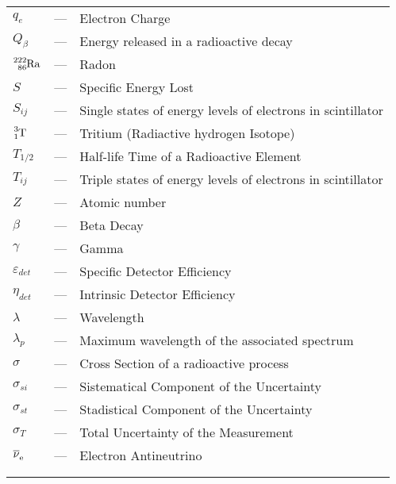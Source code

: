 \begin{longtable}{p{25mm} c p{120mm} }
$q_{e}$ & --- & Electron Charge\\
$Q_\beta$ & --- & Energy released in a radioactive decay\\
$\ce{^{222}_{86}Ra}$ & --- & Radon\\
$S$ & --- & Specific Energy Lost\\
$S_{ij}$ & --- & Single states of energy levels of electrons in scintillator\\
$\ce{^{3}_{1}T}$ & --- & Tritium (Radiactive hydrogen Isotope)\\
$T_{1/2}$ & --- & Half-life Time of a Radioactive Element\\
$T_{ij}$ & --- & Triple states of energy levels of electrons in scintillator\\
$Z$ & --- & Atomic number\\
$\beta$ & --- & Beta Decay\\
$\gamma$ & --- & Gamma\\
$\varepsilon_{det}$ & --- & Specific Detector Efficiency\\
$\eta_{det}$ & --- & Intrinsic Detector Efficiency\\
$\lambda$ & --- & Wavelength\\
$\lambda_p$ & --- & Maximum wavelength of the
\newline associated spectrum\\
$\sigma$ & --- & Cross Section of a radioactive process\\
$\sigma_{si}$ & --- & Sistematical Component of the Uncertainty\\
$\sigma_{st}$ & --- & Stadistical Component of the Uncertainty\\
$\sigma_{T}$ & --- & Total Uncertainty of the Measurement\\
$\ce{\overline{\nu}_e}$ & --- & Electron Antineutrino\\
\\
\\


\end{longtable}
